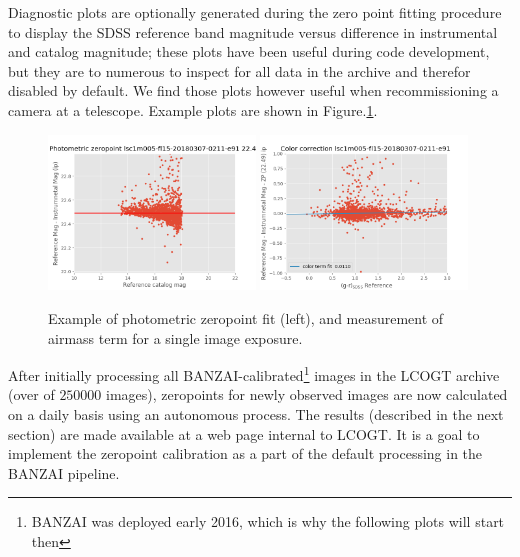 \documentclass[draft]{spieman}
\begin{document}
Diagnostic plots are optionally generated during the zero point fitting procedure to display the
SDSS reference band magnitude versus difference in instrumental and catalog magnitude; these plots
have been useful during code development, but they are to numerous to inspect for all data in the
archive and therefor disabled by default. We find those plots however useful when recommissioning a
camera at a telescope. Example plots are shown in Figure.\ref{fig_singleimageexample}.


\begin{figure}
\centering
\includegraphics[width=0.49\textwidth]{images/example_zeropointfit.png} \hspace*{\fill}
\includegraphics[width=0.49\textwidth]{images/example_colortermfit.png} \\[1ex]
\caption{\label{fig_singleimageexample}Example of photometric zeropoint fit (left), and measurement of
airmass term for a single image exposure.}
\end{figure}

After initially processing all BANZAI-calibrated\footnote{BANZAI was deployed early 2016, which 
is why the following plots will start then} images 
in the LCOGT archive (over of $250000$ images), zeropoints for newly observed  images are now 
calculated on a daily basis using an autonomous process. The results (described in the next section) 
are made available at a web page internal to LCOGT. It is a goal to implement the zeropoint 
calibration as a part of the default processing in the BANZAI pipeline.
\end{document}
